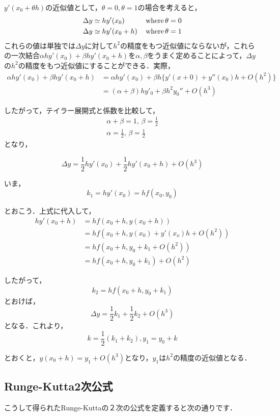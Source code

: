 \documentclass[11pt,dvipdfmx]{jsarticle}
\begin{document}
\(y'(x_0 +\theta h)\)の近似値として，\(\theta=0, \theta=1\)の場合を考えると，
\[
\begin{aligned}
\Delta y &\simeq hy'(x_0) \, &{\rm where}\, &\theta=0\\
\Delta y &\simeq hy'(x_0+h)  \, &{\rm where}\, &\theta=1
\end{aligned}
\]
これらの値は単独では\(\Delta y\)に対して\(h^2\)の精度をもつ近似値にならないが，これらの一次結合\(\alpha h y'(x_0)+\beta hy'(x_0+h)\)を\(\alpha, \beta\)をうまく定めることによって，\(\Delta y\)の\(h^2\)の精度をもつ近似値にすることができる．実際，
\[
\begin{aligned}
\alpha h y'(x_0)+\beta hy'(x_0+h) & =\alpha h y'(x_0)+\beta h \{y'(x+0)+y''(x_0)h+O(h^2)\} \\
& =(\alpha+\beta)hy'_0 + \beta h^2 y_0'' + O(h^3)
\end{aligned}
\]

したがって，テイラー展開式と係数を比較して， \[
\begin{aligned}
\alpha + \beta = 1, \, \beta = \frac{1}{2}\\
\alpha = \frac{1}{2}, \, \beta =\frac{1}{2}
\end{aligned}\] となり，

\[
\Delta y = \frac{1}{2}hy'(x_0) + \frac{1}{2}hy'(x_0+h)+O(h^3)
\]

いま， \[
k_1 =hy'(x_0) =hf(x_0,y_0)
\]

とおこう．上式に代入して， \[
\begin{aligned}
hy'(x_0+h) &= hf(x_0+h,y(x_0+h)) \\
& =hf(x_0+h, y(x_0)+y'(x_o)h+O(h^2)) \\
& =hf(x_0+h, y_0+k_1+O(h^2)) \\
& =hf(x_0+h, y_0+k_1)+O(h^2)
\end{aligned}\]

したがって， \[
k_2 = hf(x_0+h, y_0+k_1)
\] とおけば， \[
\Delta y = \frac{1}{2}k_1 + \frac{1}{2}k_2 + O(h^3)
\] となる．これより， \[
k = \frac{1}{2}(k_1+k_2), y_1 = y_0 +k
\]

とおくと，\(y(x_0+h) = y_1+O(h^3)\)となり，\(y_1\)は\(h^2\)の精度の近似値となる．

    \subsection{Runge-Kutta2次公式}\label{runge-kutta2ux6b21ux516cux5f0f}

こうして得られたRunge-Kuttaの２次の公式を定義すると次の通りです．
\end{document}
